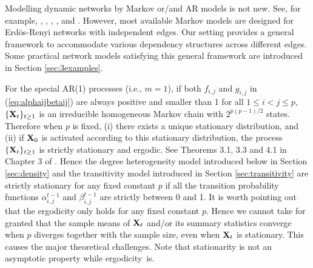 \documentclass[12pt]{article}
\newcommand{\bX}{{\bf X}}
\newcommand{\0}{{\bf 0}}
\begin{document}
 Modelling dynamic networks by Markov or/and AR models is not new. See, for example, \cite{snijder2005}, \cite{ludkin18}, \cite{yang2011}, \cite{yudovina2015}, and \cite{Jiang2023}. However, most available Markov models are designed for  Erd\"os-Renyi networks with independent edges. Our setting provides a general framework to accommodate various dependency structures across different edges. Some practical network models satisfying this general framework are introduced in Section \ref{sec:3examples}.



For the special AR(1) processes (i.e., $m=1$), if both $f_{i,j}$ and $g_{i,j}$ in (\ref{eq:alphaijbetaij}) are always positive and smaller than 1 for all $1\le i < j\le p$, $\{\bX_t\}_{t\geq1}$ is an irreducible homogeneous Markov chain with $2^{p(p-1)/2}$ states. Therefore when $p$ is  fixed,  (i) there exists a unique stationary distribution, and (ii)  if $\bX_0$ is activated according to this stationary distribution, the process $\{ \bX_t\}_{t\geq 1}$ is strictly stationary and ergodic. See Theorems 3.1, 3.3 and 4.1 in Chapter 3 of \cite{bremaud1998}.  
Hence the degree heterogeneity model introduced below in Section \ref{sec:density} 
and the transitivity model introduced in Section \ref{sec:transitivity} are strictly stationary for any fixed constant $p$ if all the transition probability functions $\alpha_{i,j}^{t-1}$ and $\beta_{i,j}^{t-1}$ are strictly between 0 and 1. 
It is worth pointing out that the ergodicity only holds for any fixed constant $p$. Hence we cannot take for granted that the sample means of $\bX_t$ and/or its summary statistics converge when $p$ diverges together with the sample size, even when $\bX_t$ is stationary. This causes the major theoretical challenges. Note that  stationarity is  not an asymptotic
property while ergodicity~is. 
\end{document}
